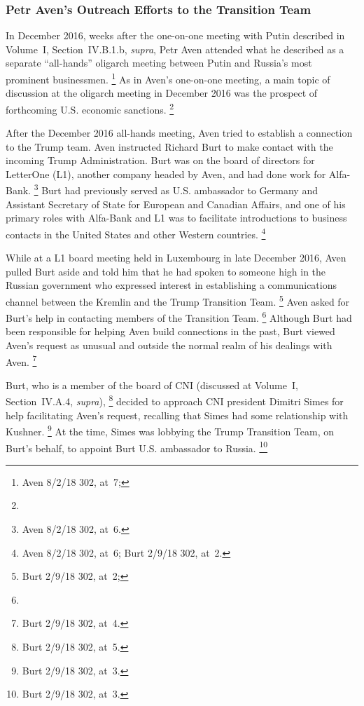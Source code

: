 \subsubsection{Petr Aven's Outreach Efforts to the Transition Team}

In December 2016, weeks after the one-on-one meeting with Putin described in Volume~I, Section~IV.B.1.b, \textit{supra}, Petr Aven attended what he described as a separate ``all-hands'' oligarch meeting between Putin and Russia's most prominent businessmen.%
\footnote{Aven 8/2/18 302, at~7; }
As in Aven's one-on-one meeting, a main topic of discussion at the oligarch meeting in December 2016 was the prospect of forthcoming U.S. economic sanctions.%
\footnote{}

After the December 2016 all-hands meeting, Aven tried to establish a connection to the Trump team.
Aven instructed Richard Burt to make contact with the incoming Trump Administration.
Burt was on the board of directors for LetterOne (L1), another company headed by Aven, and had done work for Alfa-Bank.%
\footnote{ Aven 8/2/18 302, at~6.}
Burt had previously served as U.S. ambassador to Germany and Assistant Secretary of State for European and Canadian Affairs, and one of his primary roles with Alfa-Bank and L1 was to facilitate introductions to business contacts in the United States and other Western countries.%
\footnote{ Aven 8/2/18 302, at~6;
Burt 2/9/18 302, at~2.}

While at a L1 board meeting held in Luxembourg in late December 2016, Aven pulled Burt aside and told him that he had spoken to someone high in the Russian government who expressed interest in establishing a communications channel between the Kremlin and the Trump Transition Team.%
\footnote{Burt 2/9/18 302, at~2; }
Aven asked for Burt's help in contacting members of the Transition Team.%
\footnote{}
Although Burt had been responsible for helping Aven build connections in the past, Burt viewed Aven's request as unusual and outside the normal realm of his dealings with Aven.%
\footnote{Burt 2/9/18 302, at~4.}

Burt, who is a member of the board of CNI (discussed at Volume~I, Section~IV.A.4, \textit{supra}),%
\footnote{Burt 2/9/18 302, at~5.}
decided to approach CNI president Dimitri Simes for help facilitating Aven's request, recalling that Simes had some relationship with Kushner.%
\footnote{Burt 2/9/18 302, at~3.}
At the time, Simes was lobbying the Trump Transition Team, on Burt's behalf, to appoint Burt U.S. ambassador to Russia.%
\footnote{Burt 2/9/18 302, at~3.}

